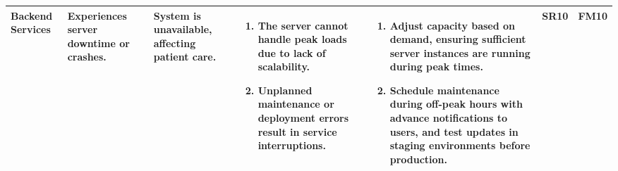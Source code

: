 \documentclass{article}
\begin{document}
\begin{landscape}
\begin{table}[ht]
{\begin{tabular}{|p{2.5cm}|p{2.5cm}|p{3cm}|p{5cm}|p{6cm}|p{1cm}|p{1cm}|}
    Backend Services
     & Experiences server downtime or crashes.
     & System is unavailable, affecting patient care.
     &
     \begin{enumerate}[leftmargin=*, label={\alph*.}, itemsep=1pt]
         \item The server cannot handle peak loads due to lack of scalability.
         \item Unplanned maintenance or deployment errors result in service interruptions.
     \end{enumerate}
     &
     \begin{enumerate}[leftmargin=*, label={\alph*.}, itemsep=1pt]
         \item Adjust capacity based on demand, ensuring sufficient server instances are running during peak times.
         \item Schedule maintenance during off-peak hours with advance notifications to users, and test updates in staging environments before production.
     \end{enumerate}
     & SR10 & FM10 \\ \hline

    \end{tabular}
    }
    \end{table}
\end{landscape}
\end{document}
